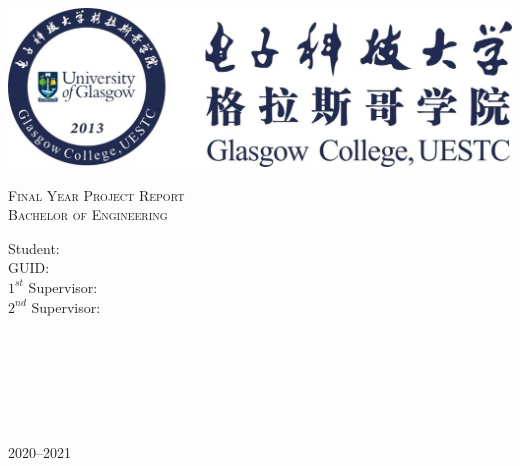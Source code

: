 \begin{titlepage}
    \begin{center}

        \includegraphics{Figures/Badge.jpg}
        \vspace*{.08\textheight}

        \textsc{\Large Final Year Project Report\\Bachelor of Engineering}\\[2cm] %

        {\LARGE \bfseries \thesistitle\par}\vspace{3cm}%

        \begin{minipage}[t]{0.4\textwidth}
            \begin{flushleft} \LARGE
                Student:\\
                \vspace*{.02\textheight}
                GUID:\\
                \vspace*{.02\textheight}
                \(1^{st}\) Supervisor:\\
                \vspace*{.02\textheight}
                \(2^{nd}\) Supervisor:\\
            \end{flushleft}
        \end{minipage}
        \begin{minipage}[t]{0.4\textwidth}
            \begin{flushright} \LARGE
                \student{}\\
                \vspace*{.02\textheight}
                \GUID{}\\
                \vspace*{.02\textheight}
                \firstsupervisor{}\\
                \vspace*{.02\textheight}
                \secondsupervisor{}\\
            \end{flushright}
        \end{minipage}\\[1.5cm]

        \vfill
        {\huge 2020--2021}\\[3cm] %
    \end{center}
\end{titlepage}
